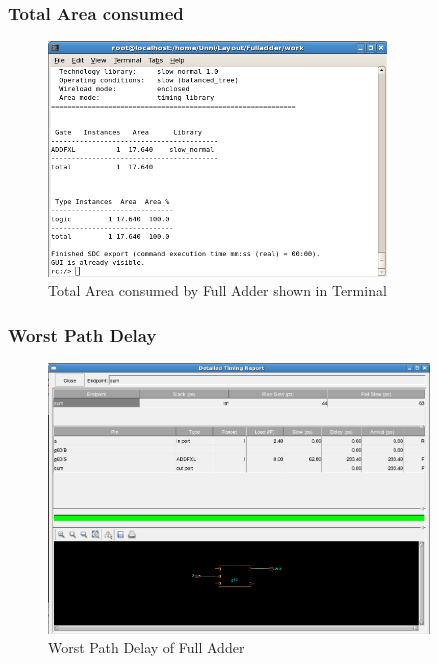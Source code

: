 \subsubsection*{Total Area consumed}
\FloatBarrier
\begin{figure}[!htpb]
\centering
\includegraphics[width=0.8\textwidth]{images/areartl.png}
\caption{Total Area consumed by Full Adder shown in Terminal}
\end{figure}

\subsubsection*{Worst Path Delay}
\FloatBarrier
\begin{figure}[!htpb]
\centering
\includegraphics[width=0.9\textwidth]{images/worstpath.png}
\caption{Worst Path Delay of Full Adder}
\end{figure}


